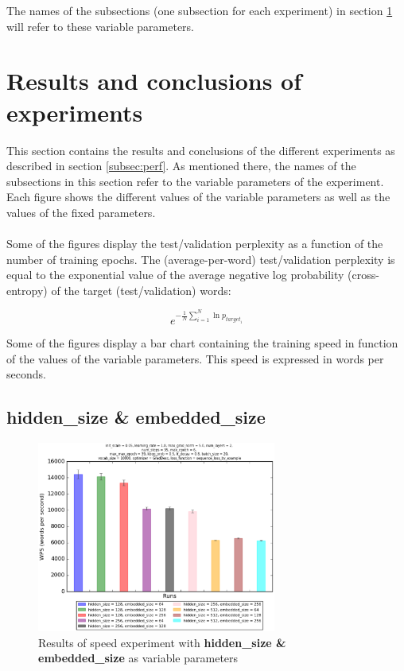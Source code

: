 \documentclass[10pt,a4paper,titlepage]{article}
\begin{document}
\noindent
The names of the subsections (one subsection for each experiment) in section \ref{sec:results} will refer to these variable parameters.

\section{Results and conclusions of experiments}
\label{sec:results}

This section contains the results and conclusions of the different experiments as described in section \ref{subsec:perf}. As mentioned there, the names of the subsections in this section refer to the variable parameters of the experiment. Each figure shows the different values of the variable parameters as well as the values of the fixed parameters.\\
\\
Some of the figures display the test/validation perplexity as a function of the number of training epochs. The (average-per-word) test/validation perplexity is equal to the exponential value of the average negative log probability (cross-entropy) of the target (test/validation) words:

\[ e^{-\frac{1}{N} \sum_{i=1}^{N} \ln p_{target_{i}}} \]

\noindent
Some of the figures display a bar chart containing the training speed in function of the values of the variable parameters. This speed is expressed in words per seconds.

\subsection{hidden\_size \& embedded\_size}

\begin{figure}[H]
	\begin{center}
		\includegraphics[width=0.70\textwidth]{hidembspeed.eps}
		\caption{Results of speed experiment with \textbf{hidden\_size \& embedded\_size} as variable parameters}
		\label{fig:exp1speed}
	\end{center}	
\end{figure}
\end{document}
